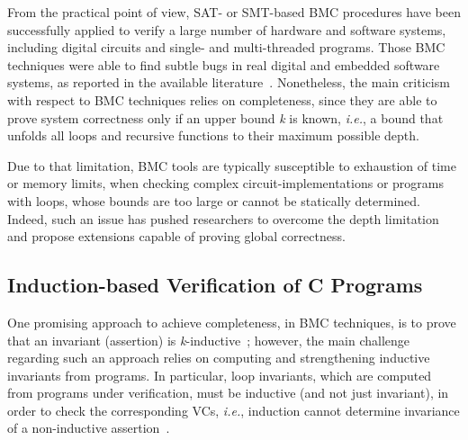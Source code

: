 \documentclass[format=acmsmall, review=false, screen=true]{acmart}
\begin{document}
From the practical point of view, SAT- or SMT-based BMC procedures have been successfully applied to verify a large number of hardware and software systems, including digital circuits and single- and multi-threaded programs. Those BMC techniques were able to find subtle bugs in real digital and embedded software systems, as reported in the available literature~\cite{Clarke04,MerzFS12,CordeiroF11,Ivancic05,Cordeiro12}. Nonetheless, the main criticism with respect to BMC techniques relies on completeness, since they are able to prove system correctness only if an upper bound \textit{k} is known, {\it i.e.}, a bound that unfolds all loops and recursive functions to their maximum possible depth. 

Due to that limitation, BMC tools are typically susceptible to exhaustion of time or memory limits, when checking complex circuit-implementations or programs with loops, whose bounds are too large or cannot be statically determined. Indeed, such an issue has pushed researchers to overcome the depth limitation and propose extensions capable of proving global correctness.

\subsection{Induction-based Verification of C Programs}

One promising approach to achieve completeness, in BMC techniques, is to prove that an invariant (assertion) is \textit{k}-inductive~\cite{EenS03,Sheera00}; however, the main challenge regarding such an approach relies on computing and strengthening inductive invariants from programs. In particular, loop invariants, which are computed from programs under verification, must be inductive (and not just invariant), in order to check the corresponding VCs, {\it i.e.}, induction cannot determine invariance of a non-inductive assertion~\cite{Bradley07}. 
\end{document}
